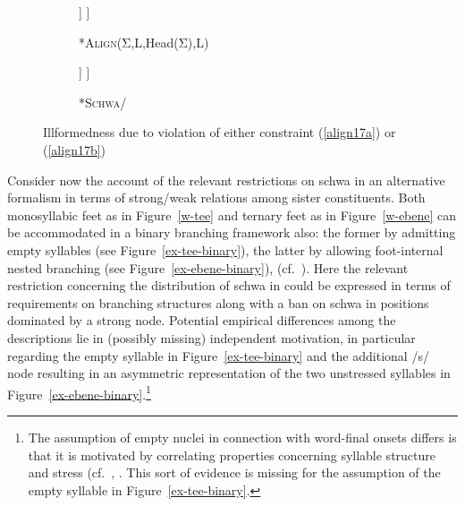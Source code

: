 \documentclass[output=paper
 ,nobabel
 ,draftmode
 ,colorlinks, citecolor=brown
]{langscibook}
\begin{document}
\begin{figure}
\begin{subfigure}{.49\textwidth}
\centering
\begin{forest}%
[*ω
	[Σ\sub{Hd}
		[$\sigma$\\
		$\Delta$\\
		{(tə)}
		]
	]
]
\end{forest}
\caption{*\textsc{Align}(Σ,L,Head(Σ),L)}\label{ex-tee-align}
\end{subfigure}
%
\begin{subfigure}{.49\textwidth}
\centering
\begin{forest}%
[*ω
	[Σ\sub{Hd}
		[$\sigma$\sub{Hd}\\
		$\Delta$\\
		{(tə)}
		]
	]
]
\end{forest}
\caption{*\textsc{Schwa}/}\label{ex-tee-schwa}
\end{subfigure}
\caption{Illformedness due to violation of either constraint (\ref{align17a}) or (\ref{align17b})}
\end{figure}

Consider now the account of the relevant restrictions on schwa in an alternative formalism in terms
of strong/weak relations among sister constituents. Both monosyllabic feet as in Figure~\ref{w-tee}
and ternary feet as in Figure~\ref{w-ebene} can be accommodated in a binary branching framework
also: the former by admitting empty syllables (see Figure~\ref{ex-tee-binary}), the latter by
allowing foot-internal nested branching (see Figure~\ref{ex-ebene-binary}), (cf.\
\citealp[57]{Giegerich1985}). Here the relevant restriction concerning the distribution of schwa in
\ili{German} could be expressed in terms of requirements on branching structures along with a ban on schwa
in positions dominated by a strong node. Potential empirical differences among the descriptions lie
in (possibly missing) independent motivation, in particular regarding the empty syllable in  Figure~\ref{ex-tee-binary} and the additional /s/ node resulting in an asymmetric representation of the two unstressed syllables in Figure~\ref{ex-ebene-binary}.\footnote{The assumption of empty nuclei in connection with word-final onsets differs is that it is motivated by correlating properties concerning syllable structure and stress (cf.\ \citealp{HarrisGussman2002}, \citet[88--90]{Raffelsiefen2021}. This sort of evidence is missing for the assumption of the empty syllable in Figure~\ref{ex-tee-binary}.}  
\end{document}
